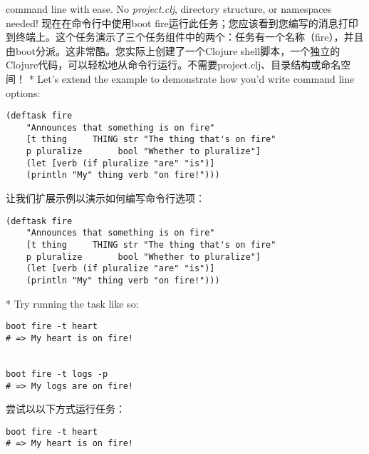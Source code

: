 \begin{paracol}{2}
command line with ease. No \emph{project.clj}, directory structure, or
namespaces needed!
\switchcolumn
现在在命令行中使用boot fire运行此任务；您应该看到您编写的消息打印到终端上。这个任务演示了三个任务组件中的两个：任务有一个名称（fire），并且由boot分派。这非常酷。您实际上创建了一个Clojure shell脚本，一个独立的Clojure代码，可以轻松地从命令行运行。不需要project.clj、目录结构或命名空间！
\switchcolumn[0]*
Let's extend the example to demonstrate how you'd write command line
options:
\begin{verbatim}
(deftask fire
    "Announces that something is on fire"
    [t thing     THING str "The thing that's on fire"
    p pluralize       bool "Whether to pluralize"]
    (let [verb (if pluralize "are" "is")]
    (println "My" thing verb "on fire!")))
\end{verbatim}
\switchcolumn
让我们扩展示例以演示如何编写命令行选项：
\begin{verbatim}
(deftask fire
    "Announces that something is on fire"
    [t thing     THING str "The thing that's on fire"
    p pluralize       bool "Whether to pluralize"]
    (let [verb (if pluralize "are" "is")]
    (println "My" thing verb "on fire!")))
\end{verbatim}
\switchcolumn[0]*
Try running the task like so:
\begin{verbatim}
boot fire -t heart
# => My heart is on fire!


boot fire -t logs -p
# => My logs are on fire!
\end{verbatim}
\switchcolumn
尝试以以下方式运行任务：
\begin{verbatim}
boot fire -t heart
# => My heart is on fire!



\end{verbatim}
\end{paracol}
